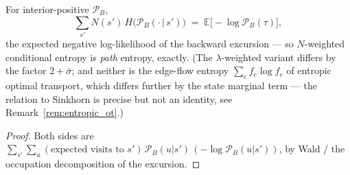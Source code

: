 \begin{lemma}\label{lem:traj_entropy}
For interior-positive $\mathcal P_B$,
\begin{equation*}
    \sum_{s'} N(s')\,H\bigl(\mathcal P_B(\cdot\,|\,s')\bigr)
    \;=\; \mathbb E\bigl[-\log \mathcal P_B(\tau)\bigr],
\end{equation*}
the expected negative log-likelihood of the backward excursion --- so $N$-weighted
conditional entropy is \emph{path} entropy, exactly. (The $\lambda$-weighted variant
differs by the factor $2+\bar\sigma$; and neither is the edge-flow entropy
$\sum_e f_e\log f_e$ of entropic optimal transport, which differs further by the state
marginal term --- the relation to Sinkhorn is precise but not an identity, see
Remark~\ref{rem:entropic_ot}.)
\end{lemma}

\begin{proof}
Both sides are $\sum_{s'}\sum_u (\text{expected visits to } s')\,
\mathcal P_B(u|s')\allowbreak\,(-\log\mathcal P_B(u|s'))$, by Wald / the occupation
decomposition of the excursion.
\end{proof}

